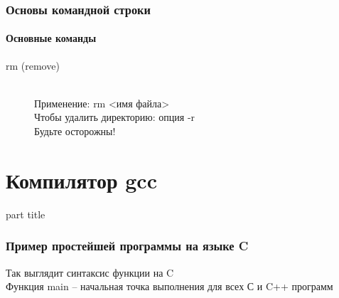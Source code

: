 \documentclass[14pt,pdf,hyperref={unicode}]{beamer}
\begin{document}
\begin{frame}
\frametitle{Основы командной строки} 
\framesubtitle{Основные команды}
\begin{description}
  \item[rm (remove)] \hfill \\
  Применение: rm <имя файла> \\
  Чтобы удалить директорию: опция -r\\
  Будьте осторожны!
\end{description}
\end{frame}

\section{Компилятор gcc}
\begin{frame}
\begin{center}
\begin{beamercolorbox}[sep=8pt,center]{part
title}
\insertsection
\end{beamercolorbox}
\end{center}
\end{frame}

\begin{frame}
\frametitle{Пример простейшей программы на языке C}



Так выглядит синтаксис функции на C \\
Функция main -- начальная точка выполнения для всех С и C++ программ

\end{frame}
\end{document}
